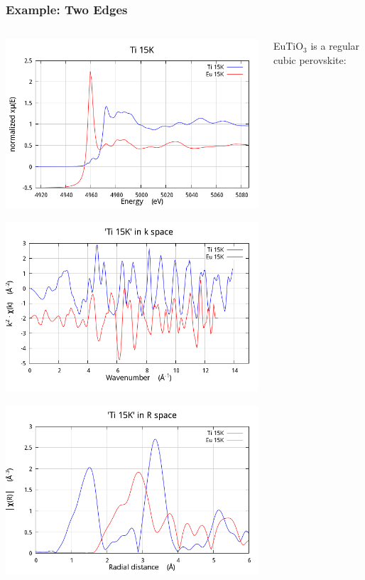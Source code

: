 \documentclass[10pt, xcolor=x11names, compress]{beamer}
\newcommand{\eto}{EuTiO$_3$}
\begin{document}
\begin{frame}
  \frametitle{Example: Two Edges}
  \begin{columns}[T]
    \begin{column}{0.35\linewidth}
      \includegraphics[width=\linewidth]{mds/eto_xanes.png}      

      \includegraphics[width=\linewidth]{mds/eto_chik.png}      

      \includegraphics[width=\linewidth]{mds/eto_chir.png}
    \end{column}
    \begin{column}{0.65\linewidth}
      \small
      {\eto} is a regular cubic perovskite:


\end{column}
\end{columns}
\end{frame}
\end{document}
